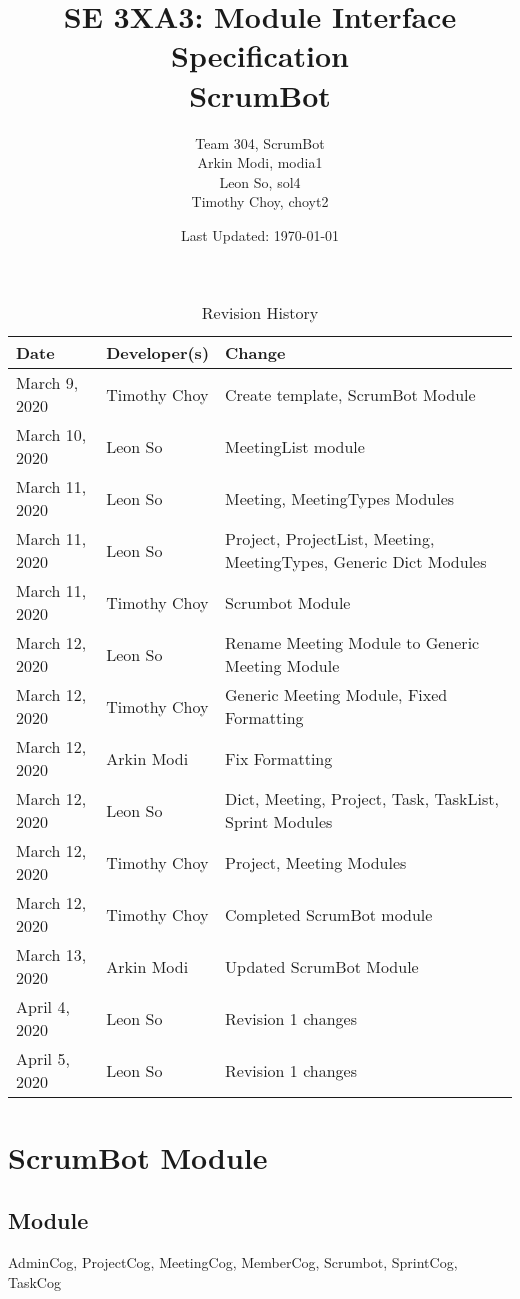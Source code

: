 \documentclass[12pt, titlepage]{article}
\title{SE 3XA3: Module Interface Specification\\ScrumBot}
\author{
    Team 304, ScrumBot
        \\ Arkin Modi, modia1
        \\ Leon So, sol4
        \\ Timothy Choy, choyt2
}
\date{Last Updated: \today}
\begin{document}
\maketitle

\begin{table}[H]
    \caption{Revision History} \label{TblRevisionHistory}
    \begin{tabularx}{\textwidth}{llX}
        \toprule
            \textbf{Date} & \textbf{Developer(s)} & \textbf{Change}\\
        \midrule
            March 9, 2020 & Timothy Choy & Create template, ScrumBot Module\\
            March 10, 2020 & Leon So & MeetingList module\\
            March 11, 2020 & Leon So & Meeting, MeetingTypes Modules\\
            March 11, 2020 & Leon So & Project, ProjectList, Meeting, MeetingTypes, Generic Dict Modules\\
            March 11, 2020 & Timothy Choy & Scrumbot Module\\
            March 12, 2020 & Leon So & Rename Meeting Module to Generic Meeting Module\\
            March 12, 2020 & Timothy Choy & Generic Meeting Module, Fixed Formatting\\
            March 12, 2020 & Arkin Modi & Fix Formatting\\
            March 12, 2020 & Leon So & Dict, Meeting, Project, Task, TaskList, Sprint Modules\\
            March 12, 2020 & Timothy Choy & Project, Meeting Modules\\
            March 12, 2020 & Timothy Choy & Completed ScrumBot module\\
            March 13, 2020 & Arkin Modi & Updated ScrumBot Module\\
            April 4, 2020 & Leon So & Revision 1 changes\\
            April 5, 2020 & Leon So & Revision 1 changes\\
        \bottomrule
    \end{tabularx}
\end{table}

\newpage
\section* {ScrumBot Module}

\subsection*{Module}
AdminCog, ProjectCog, MeetingCog, MemberCog, Scrumbot, SprintCog, TaskCog
\end{document}
